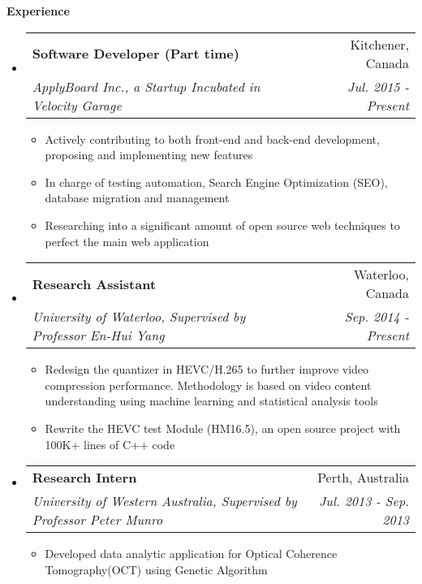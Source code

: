 \documentclass[letterpaper,10pt]{article}
\makeatletter
\newcommand{\resitem}[1]{\item #1 \vspace{-2pt}}
\newcommand{\resheading}[1]{{\large \colorbox{mygrey}{\begin{minipage}{\textwidth}{\textbf{#1 \vphantom{p\^{E}}}}\end{minipage}}}}
\newcommand{\ressubheading}[4]{
\begin{tabular*}{7.0in}{l@{\extracolsep{\fill}}r}
		\textbf{#1} & #2 \\
		\textit{#3} & \textit{#4} \\
\end{tabular*}\vspace{-6pt}}
\makeatother
\begin{document}
\resheading{Experience}
\begin{itemize}
\itemsep0em
\item
	\ressubheading{Software Developer (Part time)}{Kitchener, Canada}{ApplyBoard Inc., a Startup Incubated in Velocity Garage}{ Jul. 2015 - Present}
	\begin{itemize}
		\resitem{Actively contributing to both front-end and back-end development, proposing and implementing new features}
		\resitem{In charge of testing automation, Search Engine Optimization (SEO), database migration and management}
		\resitem{Researching into a significant amount of open source web techniques to perfect the main web application}
	\end{itemize}
\item
	\ressubheading{Research Assistant}{Waterloo, Canada}{University of Waterloo, Supervised by Professor En-Hui Yang}{Sep. 2014 - Present}
	\begin{itemize}
		\resitem{Redesign the quantizer in HEVC/H.265 to further improve video compression performance. Methodology is based on video content understanding using machine learning and statistical analysis tools}
		\resitem{Rewrite the HEVC test Module (HM16.5), an open source project with 100K+ lines of C++ code}
	\end{itemize}
\item
	\ressubheading{Research Intern}{Perth, Australia}{University of Western Australia, Supervised by Professor Peter Munro}{Jul. 2013 - Sep. 2013}
	\begin{itemize}
		\resitem{Developed data analytic application for Optical Coherence Tomography(OCT) using Genetic Algorithm }
	\end{itemize}
\end{itemize}
\end{document}
